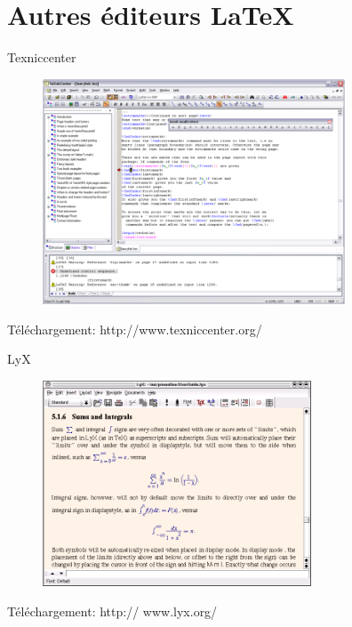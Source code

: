 \documentclass{beamer}
\begin{document}

\section{Autres éditeurs \LaTeX}



\begin{frame}{Texniccenter}

\begin{figure} %
\centering %
\includegraphics[width=9cm]{img/Texniccenter} %
\end{figure} %

{\footnotesize Téléchargement: http://www.texniccenter.org/ }

\end{frame}



\begin{frame}{LyX}

\begin{figure} %
\centering %
\includegraphics[width=8cm]{img/LyXScreen_Linux_en} %
\end{figure} %

{\footnotesize Téléchargement: http:// 	www.lyx.org/ }

\end{frame}
\end{document}
